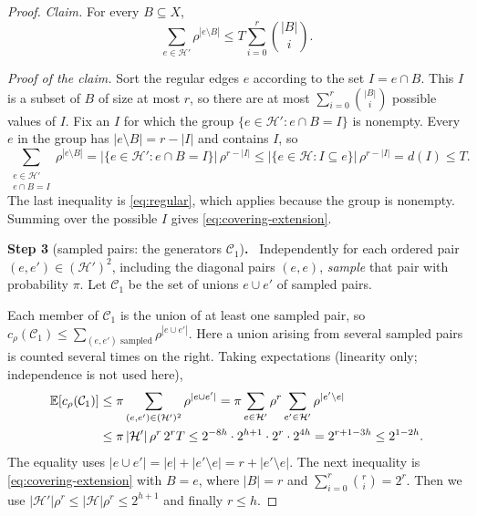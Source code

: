 \documentclass[11pt,letterpaper]{article}
\theoremstyle{definition}
\theoremstyle{remark}
\numberwithin{equation}{section}
\newcommand{\step}[2]{\medskip\noindent\textbf{Step #1} (#2)\textbf{.}\ }
\begin{document}
\begin{proof}
\emph{Claim.} For every \(B\subseteq X\),
\begin{equation}\label{eq:covering-extension}
\sum_{e\in\mathcal H'}\rho^{|e\setminus B|}
\le T\sum_{i=0}^r\binom{|B|}{i}.
\end{equation}

\emph{Proof of the claim.} Sort the regular edges $e$ according to the set
$I=e\cap B$. This $I$ is a subset of $B$ of size at most $r$, so there are
at most $\sum_{i=0}^r\binom{|B|}{i}$ possible values of $I$. Fix an $I$ for
which the group $\{e\in\mathcal H':e\cap B=I\}$ is nonempty. Every $e$ in
the group has $|e\setminus B|=r-|I|$ and contains $I$, so
\[
\sum_{\substack{e\in\mathcal H'\\e\cap B=I}}
  \rho^{|e\setminus B|}
=|\{e\in\mathcal H':e\cap B=I\}|\,\rho^{r-|I|}
\le|\{e\in\mathcal H:I\subseteq e\}|\,\rho^{r-|I|}
= d(I)\le T.
\]
The last inequality is \eqref{eq:regular}, which applies because the group
is nonempty. Summing over the possible $I$ gives
\eqref{eq:covering-extension}.

\step{3}{sampled pairs: the generators $\mathcal C_1$}
Independently for each ordered pair \((e,e')\in(\mathcal H')^2\),
including the diagonal pairs $(e,e)$, \emph{sample} that pair with
probability \(\pi\). Let \(\mathcal C_1\) be the set of unions $e\cup e'$
of sampled pairs.

Each member of $\mathcal C_1$ is the union of at least one sampled pair, so
$c_\rho(\mathcal C_1)\le\sum_{(e,e')\text{ sampled}}\rho^{|e\cup e'|}$.
Here a union arising from several sampled pairs is counted several
times on the right. Taking expectations (linearity only; independence is not
used here),
\begin{align}
\mathbb E[c_\rho(\mathcal C_1)]
&\le\pi\sum_{(e,e')\in(\mathcal H')^2}\rho^{|e\cup e'|}
=\pi\sum_{e\in\mathcal H'}\rho^{r}\sum_{e'\in\mathcal H'}\rho^{|e'\setminus e|}
\notag\\
&\le\pi\,|\mathcal H'|\,\rho^r\,2^rT
\le2^{-8h}\cdot2^{h+1}\cdot2^r\cdot2^{4h}
=2^{r+1-3h}\le2^{1-2h}.
\label{eq:covering-pair-cost}
\end{align}
The equality uses $|e\cup e'|=|e|+|e'\setminus e|=r+|e'\setminus e|$. The
next inequality is \eqref{eq:covering-extension} with $B=e$, where $|B|=r$
and $\sum_{i=0}^r\binom ri=2^r$. Then we use
$|\mathcal H'|\rho^r\le|\mathcal H|\rho^r\le2^{h+1}$ and finally $r\le h$.


\end{proof}
\end{document}

